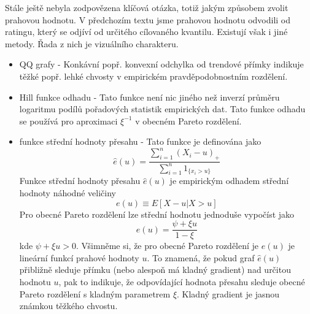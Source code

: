 Stále ještě nebyla zodpovězena klíčová otázka, totiž jakým způsobem zvolit prahovou hodnotu. V předchozím textu jsme prahovou hodnotu odvodili od ratingu, který se odjíví od určitého cílovaného kvantilu. Existují však i jiné metody. Řada z nich je vizuálního charakteru.
\begin{itemize}
\item QQ grafy - Konkávní popř. konvexní odchylka od trendové přímky indikuje těžké popř. lehké chvosty v empirickém pravděpodobnostním rozdělení.
\item Hill funkce odhadu - Tato funkce není nic jiného než inverzí průměru logaritmu podílů pořadových statistik empirických dat. Tato funkce odhadu se používá pro aproximaci $\xi^{-1}$ v obecném Pareto rozdělení.
\item funkce střední hodnoty přesahu - Tato funkce je definována jako
\begin{equation}
\hat{e}(u) = \frac{\sum_{i = 1}^n (X_i - u)_{+}}{\sum_{i = 1}^n 1_{\{x_i > u\}}}
\end{equation}
Funkce střední hodnoty přesahu $\hat{e}(u)$ je empirickým odhadem střední hodnoty náhodné veličiny
\begin{equation}
e(u) \equiv E[X - u | X > u]
\end{equation}
Pro obecné Pareto rozdělení lze střední hodnotu jednoduše vypočíst jako
\begin{equation}
e(u) = \frac{\psi + \xi u}{1 - \xi}
\end{equation}
kde $\psi + \xi u > 0$. Všimněme si, že pro obecné Pareto rozdělení je $e(u)$ je lineární funkcí prahové hodnoty $u$. To znamená, že pokud graf $\hat{e}(u)$ přibližně sleduje přímku (nebo alespoň má kladný gradient) nad určitou hodnotu $u$, pak to indikuje, že odpovídající hodnota přesahu sleduje obecné Pareto rozdělení s kladným parametrem $\xi$. Kladný gradient je jasnou známkou těžkého chvostu. 
\end{itemize}
